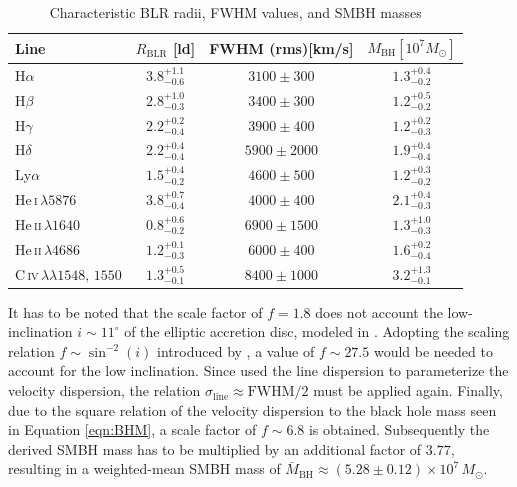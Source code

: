 \begin{table}[htp]
	\centering
	\small
	\caption{Characteristic BLR radii, FWHM values, and SMBH masses}
	\label{tab:BH_mass}
	\begin{tabular}{l c c c}
		\hline
		\hline
		\textbf{Line} & $R_{\mathrm{BLR}}$ [ld] & FWHM (rms)[km/s] & $M_{\text{BH}} [10^7 M_\odot]$ \\
		\hline
		\hline
		H$\alpha$ & $3.8 \ensuremath{_{-0.6}^{+1.1}}$ & $3100 \pm 300$ &$1.3 \ensuremath{_{-0.2}^{+0.4}}$ \\
		H$\beta$ & $2.8 \ensuremath{_{-0.3}^{+1.0}}$ & $3400 \pm 300$&$1.2 \ensuremath{_{-0.2}^{+0.5}}$ \\
		H$\gamma$ & $2.2 \ensuremath{_{-0.4}^{+0.2}}$ & $3900 \pm 400$ &$1.2 \ensuremath{_{-0.3}^{+0.2}}$ \\
		H$\delta$ & $2.2 \ensuremath{_{-0.4}^{+0.4}}$ & $5900 \pm 2000$  & $1.9 \ensuremath{_{-0.4}^{+0.4}}$ \\
		Ly$\alpha$ & $1.5 \ensuremath{_{-0.2}^{+0.4}}$ & $4600 \pm 500$ &$1.2 \ensuremath{_{-0.2}^{+0.3}}$ \\
		\hline
		He\,\textsc{i}$\,\lambda5876$ & $3.8 \ensuremath{_{-0.4}^{+0.7}}$ & $ 4000 \pm 400$&$2.1 \ensuremath{_{-0.3}^{+0.4}}$ \\
		He\,\textsc{ii}$\,\lambda1640$ & $0.8 \ensuremath{_{-0.2}^{+0.6}}$ & $6900 \pm 1500$ & $1.3 \ensuremath{_{-0.3}^{+1.0}}$ \\
		He\,\textsc{ii}$\,\lambda4686$ & $1.2 \ensuremath{_{-0.3}^{+0.1}}$ & $6000 \pm 400$ &$1.6 \ensuremath{_{-0.4}^{+0.2}}$ \\
		\hline
		C\,\textsc{iv}$\,\lambda\lambda 1548,\,1550$ & $1.3 \ensuremath{_{-0.1}^{+0.5}}$ & $8400 \pm 1000$ &$3.2 \ensuremath{_{-0.1}^{+1.3}}$ \\
		\hline
		\hline
	\end{tabular}
\end{table}
\noindent It has to be noted that the scale factor of $f=1.8$ does not account the low-inclination $i \sim 11^\circ$ of the elliptic accretion disc, modeled in \cite{Ochmann_2025}. Adopting the scaling relation $f \sim \sin^{-2}(i)$ introduced by \cite{krolik2001systematic}, a value of $f \sim 27.5$ would be needed to account for the low inclination. Since \cite{krolik2001systematic} used the line dispersion to parameterize the velocity dispersion, the relation $\sigma_{\mathrm{line}} \approx \mathrm{FWHM}/2$ \parencite{peterson2004} must be applied again. Finally, due to the square relation of the velocity dispersion to the black hole mass seen in Equation \ref{eqn:BHM}, a scale factor of $f \sim 6.8$ is obtained. Subsequently the derived SMBH mass has to be multiplied by an additional factor of $3.77$, resulting in a weighted-mean SMBH mass of $\bar{M}_{\mathrm{BH}} \approx (5.28 \pm 0.12)\times 10^{7}\,M_\odot$.




